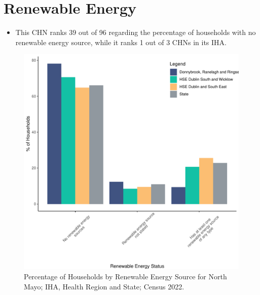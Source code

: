 \documentclass{article}
\begin{document}
\section{Renewable Energy}\label{sect:RE}
\begin{itemize}
\item This CHN ranks  39 out of 96 regarding the percentage of households with no renewable energy source, while it ranks   1 out of 3 CHNs in its IHA.
\end{itemize}
\begin{figure}[H]
	\centering
	\includegraphics[width = 140mm]{../figures/RenewableEnergyED.pdf}
	\caption{Percentage of Households by Renewable Energy Source for North Mayo; IHA, Health Region and State; Census 2022.}
	\label{fig:vbnv}
	\end{figure}
\end{document}
